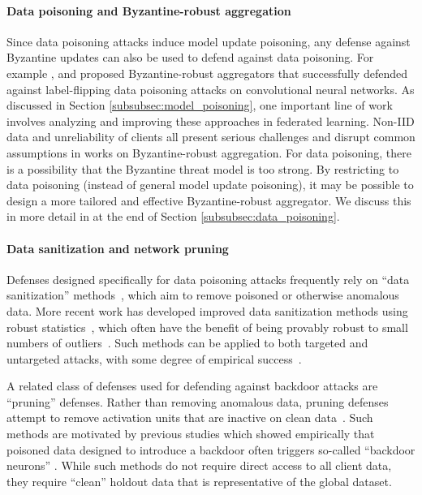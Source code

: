 \documentclass[11pt]{article}
\begin{document}
\paragraph{Data poisoning and Byzantine-robust aggregation}
Since data poisoning attacks induce model update poisoning, any defense against Byzantine updates can also be used to defend against data poisoning. For example \citet{xie2019zeno}, \citet{xie2019zeno++} and \citet{xie2019practicalsecure} proposed Byzantine-robust aggregators that successfully defended against label-flipping data poisoning attacks on convolutional neural networks. As discussed in Section \ref{subsubsec:model_poisoning}, one important line of work involves analyzing and improving these approaches in federated learning. Non-IID data and unreliability of clients all present serious challenges and disrupt common assumptions in works on Byzantine-robust aggregation. For data poisoning, there is a possibility that the Byzantine threat model is too strong. By restricting to data poisoning (instead of general model update poisoning), it may be possible to design a more tailored and effective Byzantine-robust aggregator. We discuss this in more detail in at the end of Section \ref{subsubsec:data_poisoning}.

\paragraph{Data sanitization and network pruning} 
Defenses designed specifically for data poisoning attacks frequently rely on ``data sanitization'' methods~\citep{cretu2008casting}, which aim to remove poisoned or otherwise anomalous data. More recent work has developed improved data sanitization methods using robust statistics~\citep{steinhardt2017certified, pmlr-v97-shen19e, tran2018spectral, pmlr-v97-diakonikolas19a}, which often have the benefit of being provably robust to small numbers of outliers~\citep{pmlr-v97-diakonikolas19a}. Such methods can be applied to both targeted and untargeted attacks, with some degree of empirical success~\citep{pmlr-v97-shen19e}.

A related class of defenses used for defending against backdoor attacks are ``pruning'' defenses. Rather than removing anomalous data, pruning defenses attempt to remove activation units that are inactive on clean data~\citep{liu2018fine, wang2019neural}. Such methods are motivated by previous studies which showed empirically that poisoned data designed to introduce a backdoor often triggers so-called “backdoor neurons” \citep{gu2017badnets}. While such methods do not require direct access to all client data, they require “clean” holdout data that is representative of the global dataset.
\end{document}
